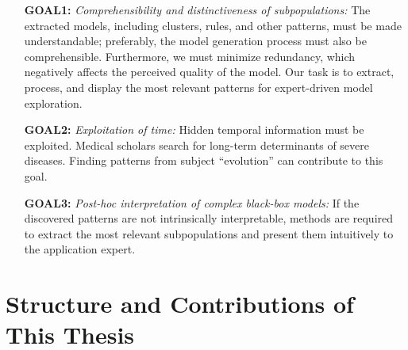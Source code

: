 \documentclass[
  oneside]{book}
\begin{document}

\begin{enumerate}
  \item[\textbf{GOAL1:}] \emph{Comprehensibility and distinctiveness of subpopulations:} The extracted models, including clusters, rules, and other patterns, must be made understandable; preferably, the model generation process must also be comprehensible. Furthermore, we must minimize redundancy, which negatively affects the perceived quality of the model. Our task is to extract, process, and display the most relevant patterns for expert-driven model exploration.
  \item[\textbf{GOAL2:}] \emph{Exploitation of time:} Hidden temporal information must be exploited. Medical scholars search for long-term determinants of severe diseases. Finding patterns from subject ``evolution'' can contribute to this goal.
  \item[\textbf{GOAL3:}] \emph{Post-hoc interpretation of complex black-box models:} If the discovered patterns are not intrinsically interpretable, methods are required to extract the most relevant subpopulations and present them intuitively to the application expert.
\end{enumerate}

\hypertarget{structure-and-contributions-of-this-thesis}{%
\section{Structure and Contributions of This Thesis}\label{structure-and-contributions-of-this-thesis}}
\end{document}
